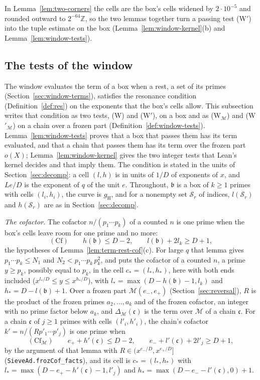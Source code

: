 \documentclass[11pt]{article}
\theoremstyle{definition}
\newcommand{\lean}[1]{\texttt{#1}}
\begin{document}
In Lemma~\ref{lem:two-corners} the cells are the box's cells widened by $2 \cdot 10^{-5}$ and rounded outward to
$2^{-64}\mathbb Z$, so the two lemmas together turn a passing test (W$'$) into the tuple estimate on the box
(Lemma~\ref{lem:window-kernel}(b) and Lemma~\ref{lem:window-tests}).

\subsection{The tests of the window}\label{sec:window-tests}

The window evaluates the term of a box when a rest, a set of its primes (Section~\ref{sec:window-terms}), satisfies the
resonance condition (Definition~\ref{def:res}) on the exponents that the box's cells allow. This subsection writes that
condition as two tests, (W) and (W$'$), on a box and as (W$_{\mathcal M}$) and (W$'_{\mathcal M}$) on a chain over a
frozen part (Definition~\ref{def:window-tests}). Lemma~\ref{lem:window-tests} proves that a box that passes them has
its term evaluated, and that a chain that passes them has its term over the frozen part $o(X)$;
Lemma~\ref{lem:window-kernel} gives the two integer tests that Lean's kernel decides and that imply them. The condition
is stated in the units of Section~\ref{sec:decomp}: a cell $(l, h)$ is in units of $1/D$ of exponents of $x$, and $Le/D$
is the exponent of $q$ of the unit $e$. Throughout, $\mathfrak b$ is a box of $k \ge 1$ primes with cells $(l_i, h_i)$,
the curve is $g_{\mathrm H}$, and for a nonempty set $\mathcal S_r$ of indices, $l(\mathcal S_r)$ and $h(\mathcal S_r)$
are as in Section~\ref{sec:decomp}.

\emph{The cofactor.} The cofactor $n/(p_1 \cdots p_k)$ of a counted $n$ is one prime when the box's cells leave room
for one prime and no more:
\[
  (\mathrm{Cf}) \qquad h(\mathfrak b) \le D - 2, \qquad l(\mathfrak b) + 2l_k \ge D + 1,
\]
the hypotheses of Lemma~\ref{lem:term-rest-cof}(c). For large $q$ that lemma gives $p_1 \cdots p_k \le N_1$ and $N_2 <
p_1 \cdots p_k\, p_k^2$, and puts the cofactor of a counted $n$, a prime $y \ge p_k$, possibly equal to $p_k$, in the
cell $c_* = (l_*, h_*)$, here with both ends included ($x^{l_*/D} \le y \le x^{h_*/D}$), with $l_* = \max(D -
h(\mathfrak b) - 1, l_k)$ and $h_* = D - l(\mathfrak b) + 1$.
Over a frozen part $\mathcal M(e_-, e_+)$ (Section~\ref{sec:reversal}), $R$ is the product of the frozen primes $a_2,
\dots, a_k$ and of the frozen cofactor, an integer with no prime factor below $a_k$, and $\Delta_{\mathcal M}(\mathfrak
c)$ is the term over $\mathcal M$ of a chain $\mathfrak c$. For a chain $\mathfrak c$ of $j \ge 1$ primes with cells
$(l'_i, h'_i)$, the chain's cofactor $k' = n/(R p'_1 \cdots p'_j)$ is one prime when
\[
  (\mathrm{Cf}_{\mathcal M}) \qquad e_+ + h'(\mathfrak c) \le D - 2, \qquad e_- + l'(\mathfrak c) + 2l'_j \ge D + 1,
\]
by the argument of that lemma with $R \in (x^{e_-/D}, x^{e_+/D}]$ (\lean{SieveAd.\allowbreak frozCof\_facts}), and
its cell is $c_* = (l_*, h_*)$ with $l_* = \max(D - e_+ - h'(\mathfrak c) - 1, l'_j)$ and $h_* = \max(D - e_- -
l'(\mathfrak c), 0) + 1$.
\end{document}
